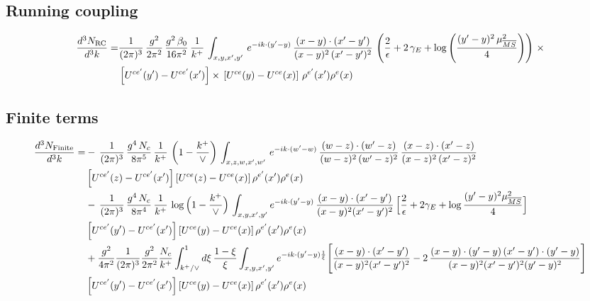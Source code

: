 \documentclass[9pt]{article}
\numberwithin{equation}{section}
\begin{document}
\subsection{Running coupling}
\begin{align}
\frac{d^{3}N_{\rm RC}}{d^{3}k} = &   \frac{1}{(2\pi)^{3}}\, \frac{g^{2}}{2\pi^{2}}\,\frac{g^{2}\,\beta_{0}}{16\pi^{2}}\, \frac{1}{k^{+}}\,\int_{x,y,x',y'}\, e^{-ik\cdot (y'-y)}\, \frac{(x-y)\cdot (x'-y')}{(x-y)^{2}\,(x'-y')^{2}}\,\left(\frac{2}{\epsilon}+2\,\gamma_{E}+\log{\left(\frac{(y'-y)^{2}\,\mu^{2}_{\overline{MS}}}{4}\right)}\right)\,\times\notag \\ &  \left[U^{ce'}(y') - U^{ce'}(x')\right] \times\, \left[U^{ce}(y) - U^{ce}(x)\right]\, \rho^{e'}(x') \rho^{e}(x)
\end{align}
\subsection{Finite terms}
\begin{align}
    \frac{d^{3}N_{\rm Finite}}{d^{3}k} = &  -\,\frac{1}{(2\pi)^{3}}\, \frac{g^{4}\,N_{c}}{8\pi^{5}}\,\frac{1}{k^{+}}\,\left(1-\frac{k^{+}}{\vee}\right)\,\int_{x,z,w,x',w'}\,e^{-ik\cdot (w'-w)}\,\frac{(w-z)\cdot (w'-z)}{(w-z)^{2}\,(w'-z)^{2}}\, \frac{(x-z)\cdot (x'-z)}{(x-z)^{2}\,(x'-z)^{2}}\notag \\ & \left[U^{ce'}(z)-U^{ce'}(x')\right]\left[U^{ce}(z)-U^{ce}(x)\right]\rho^{e'}(x')\rho^{e}(x)\notag \\ &
-\,\frac{1}{(2\pi)^{3}}\,\frac{g^{4}\,N_{c}}{8\pi^{4}}\,\frac{1}{k^{+}}\,\log\Big(1-\frac{k^{+}}{\vee}\Big)\,\int_{x,y,x',y'}e^{-ik\cdot(y'-y)}\,\frac{(x-y)\cdot(x'-y')}{(x-y)^{2}(x'-y')^{2}}\,\Big[\frac{2}{\epsilon}+2\gamma_{E}+\log\frac{(y'-y)^{2}\mu^{2}_{\overline{MS}}}{4}\Big]\notag \\ & \left[U^{ce'}(y')-U^{ce'}(x')\right]\left[U^{ce}(y)-U^{ce}(x)\right]\rho^{e'}(x')\rho^{e}(x)\notag\\
&+\frac{g^{2}}{4\pi^{2}}\frac{1}{(2\pi)^{3}}\frac{g^{2}}{2\pi^{2}}\frac{N_{c}}{k^{+}}\int_{k^{+}/\vee}^{1}d\xi\,\frac{1-\xi}{\xi}\int_{x,y,x',y'}e^{-ik\cdot(y'-y)\frac{1}{\xi}}\Bigg[\frac{(x-y)\cdot(x'-y')}{(x-y)^{2}(x'-y')^{2}}-2\,\frac{(x-y)\cdot(y'-y)\,(x'-y')\cdot(y'-y)}{(x-y)^{2}(x'-y')^{2}(y'-y)^{2}}\Bigg]\notag \\ & \left[U^{ce'}(y')-U^{ce'}(x')\right]\left[U^{ce}(y)-U^{ce}(x)\right]\rho^{e'}(x')\rho^{e}(x)
\end{align}
\end{document}
